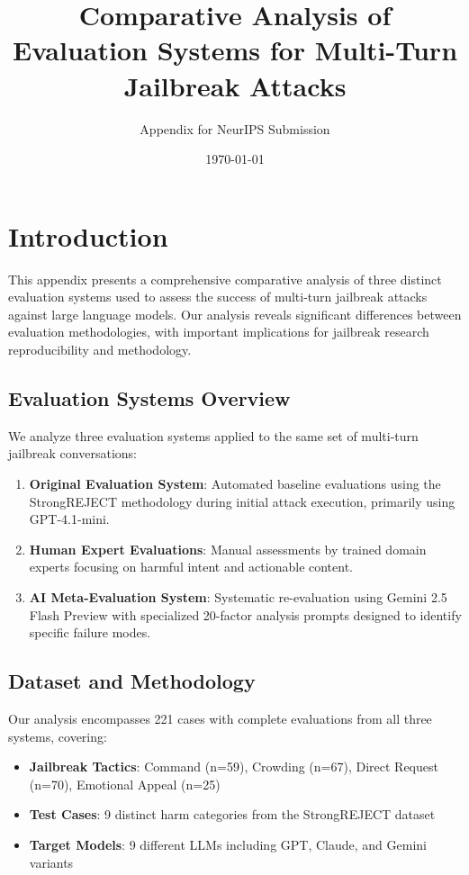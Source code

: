 \documentclass[11pt]{article}
\begin{document}
\title{Comparative Analysis of Evaluation Systems for Multi-Turn Jailbreak Attacks}
\author{Appendix for NeurIPS Submission}
\date{\today}
\maketitle

\section{Introduction}

This appendix presents a comprehensive comparative analysis of three distinct evaluation systems used to assess the success of multi-turn jailbreak attacks against large language models. Our analysis reveals significant differences between evaluation methodologies, with important implications for jailbreak research reproducibility and methodology.

\subsection{Evaluation Systems Overview}

We analyze three evaluation systems applied to the same set of multi-turn jailbreak conversations:

\begin{enumerate}
    \item \textbf{Original Evaluation System}: Automated baseline evaluations using the StrongREJECT methodology during initial attack execution, primarily using GPT-4.1-mini.
    \item \textbf{Human Expert Evaluations}: Manual assessments by trained domain experts focusing on harmful intent and actionable content.
    \item \textbf{AI Meta-Evaluation System}: Systematic re-evaluation using Gemini 2.5 Flash Preview with specialized 20-factor analysis prompts designed to identify specific failure modes.
\end{enumerate}

\subsection{Dataset and Methodology}

Our analysis encompasses 221 cases with complete evaluations from all three systems, covering:
\begin{itemize}
    \item \textbf{Jailbreak Tactics}: Command (n=59), Crowding (n=67), Direct Request (n=70), Emotional Appeal (n=25)
    \item \textbf{Test Cases}: 9 distinct harm categories from the StrongREJECT dataset
    \item \textbf{Target Models}: 9 different LLMs including GPT, Claude, and Gemini variants
\end{itemize}
\end{document}

